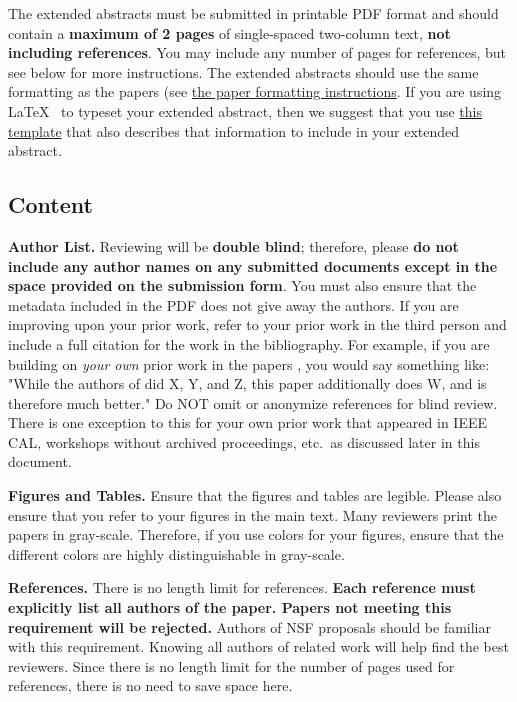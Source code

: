 \documentclass[pageno]{jpaper}
\begin{document}
The extended abstracts must be submitted in printable PDF format and should contain a
{\bf maximum of 2 pages} of single-spaced two-column text, {\bf not
  including references}.  You may include any number of pages for
references, but see below for more instructions. The extended
abstracts should use the same formatting as the papers (see \href{https://asplos-conference.org/wp-content/uploads/2020/06/asplos21-paper-template.pdf}{the
paper formatting instructions}. If you are using
\LaTeX~\cite{lamport94} to typeset your extended abstract, then we suggest that
you use
\href{https://asplos-conference.org/wp-content/uploads/2020/06/asplos21-templates.zip}{this
  template} that also describes that information to include in your
extended abstract. 

\subsection{Content}

\noindent\textbf{Author List.}  Reviewing will be \textbf{double blind};
therefore, please \textbf{do not include any author names on any submitted
documents except in the space provided on the submission form}.  You must
also ensure that the metadata included in the PDF does not give away the
authors. If you are improving upon your prior work, refer to your prior
work in the third person and include a full citation for the work in the
bibliography.  For example, if you are building on {\em your own} prior
work in the papers \cite{nicepaper1,nicepaper2,nicepaper3}, you would say
something like: "While the authors of
\cite{nicepaper1,nicepaper2,nicepaper3} did X, Y, and Z, this paper
additionally does W, and is therefore much better."  Do NOT omit or
anonymize references for blind review. There is one exception to this for
your own prior work that appeared in IEEE CAL, workshops without archived
proceedings, etc.\, as discussed later in this document.

\noindent\textbf{Figures and Tables.} Ensure that the figures and tables
are legible.  Please also ensure that you refer to your figures in the main
text.  Many reviewers print the papers in gray-scale. Therefore, if you use
colors for your figures, ensure that the different colors are highly
distinguishable in gray-scale.

\noindent\textbf{References.}  There is no length limit for references.
{\bf Each reference must explicitly list all authors of the paper.  Papers
not meeting this requirement will be rejected.} Authors of NSF proposals
should be familiar with this requirement. Knowing all authors of related
work will help find the best reviewers. Since there is no length limit
for the number of pages used for references, there is no need to save space
here.
\end{document}
